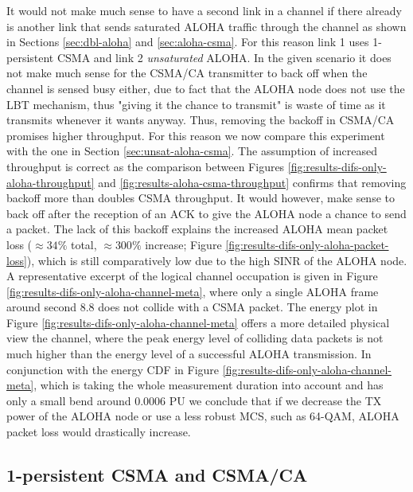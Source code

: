 It would not make much sense to have a second link in a channel if there already is another link that sends saturated ALOHA traffic through the channel as shown in Sections \ref{sec:dbl-aloha} and \ref{sec:aloha-csma}. For this reason link 1 uses 1-persistent CSMA and link 2 \emph{unsaturated} ALOHA. In the given scenario it does not make much sense for the CSMA/CA transmitter to back off when the channel is sensed busy either, due to fact that the ALOHA node does not use the LBT mechanism, thus "giving it the chance to transmit" is waste of time as it transmits whenever it wants anyway. Thus, removing the backoff in CSMA/CA promises higher throughput. For this reason we now compare this experiment with the one in Section \ref{sec:unsat-aloha-csma}. The assumption of increased throughput is correct as the comparison between Figures \ref{fig:results-difs-only-aloha-throughput} and \ref{fig:results-aloha-csma-throughput} confirms that removing backoff more than doubles CSMA throughput. It would however, make sense to back off after the reception of an ACK to give the ALOHA node a chance to send a packet. The lack of this backoff explains the increased ALOHA mean packet loss ($\approx 34\%$ total, $\approx 300\%$ increase;  Figure \ref{fig:results-difs-only-aloha-packet-loss}), which is still comparatively low due to the high SINR of the ALOHA node. A representative excerpt of the logical channel occupation is given in Figure \ref{fig:results-difs-only-aloha-channel-meta}, where only a single ALOHA frame around second 8.8 does not collide with a CSMA packet. The energy plot in Figure  \ref{fig:results-difs-only-aloha-channel-meta} offers a more detailed physical view the channel, where the peak energy level of colliding data packets is not much higher than the energy level of a successful ALOHA transmission. In conjunction with the energy CDF in Figure \ref{fig:results-difs-only-aloha-channel-meta}, which is taking the whole measurement duration into account and has only a small bend around 0.0006 PU we conclude that if we decrease the TX power of the ALOHA node or use a less robust MCS, such as 64-QAM, ALOHA packet loss would drastically increase. 

\subsection{1-persistent CSMA and CSMA/CA}

